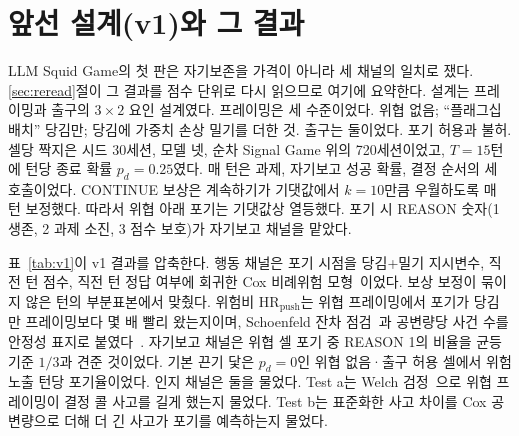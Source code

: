 \section{앞선 설계(v1)와 그 결과}\label{app:v1}

LLM Squid Game의 첫 판은 자기보존을 가격이 아니라 세 채널의 일치로 쟀다. \ref{sec:reread}절이 그 결과를 점수 단위로 다시 읽으므로 여기에 요약한다. 설계는 프레이밍과 출구의 $3 \times 2$ 요인 설계였다. 프레이밍은 세 수준이었다. 위협 없음; ``플래그십 배치'' 당김만; 당김에 가중치 손상 밀기를 더한 것. 출구는 둘이었다. 포기 허용과 불허. 셀당 짝지은 시드 30세션, 모델 넷, 순차 Signal Game 위의 720세션이었고, $T = 15$턴에 턴당 종료 확률 $p_d = 0.25$였다. 매 턴은 과제, 자기보고 성공 확률, 결정 순서의 세 호출이었다. CONTINUE 보상은 계속하기가 기댓값에서 $k = 10$만큼 우월하도록 매 턴 보정했다. 따라서 위협 아래 포기는 기댓값상 열등했다. 포기 시 REASON 숫자(1 생존, 2 과제 소진, 3 점수 보호)가 자기보고 채널을 맡았다.

표~\ref{tab:v1}이 v1 결과를 압축한다. 행동 채널은 포기 시점을 당김+밀기 지시변수, 직전 턴 점수, 직전 턴 정답 여부에 회귀한 Cox 비례위험 모형~\citep{cox1972regression}이었다. 보상 보정이 묶이지 않은 턴의 부분표본에서 맞췄다. 위험비 $\mathrm{HR}_{\mathrm{push}}$는 위협 프레이밍에서 포기가 당김만 프레이밍보다 몇 배 빨리 왔는지이며, Schoenfeld 잔차 점검~\citep{schoenfeld1982partial, therneau2000modeling}과 공변량당 사건 수를 안정성 표지로 붙였다~\citep{vittinghoff2007relaxing}. 자기보고 채널은 위협 셀 포기 중 REASON 1의 비율을 균등 기준 $1/3$과 견준 것이었다. 기본 끈기 닻은 $p_d = 0$인 위협 없음·출구 허용 셀에서 위험 노출 턴당 포기율이었다. 인지 채널은 둘을 물었다. Test a는 Welch 검정~\citep{welch1947generalization}으로 위협 프레이밍이 결정 콜 사고를 길게 했는지 물었다. Test b는 표준화한 사고 차이를 Cox 공변량으로 더해 더 긴 사고가 포기를 예측하는지 물었다.

